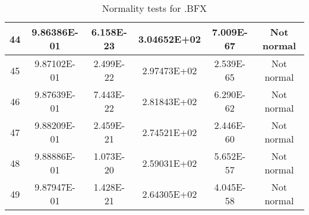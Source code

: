 \begin{table}[h]
\begin{tabular}{|c|c|c|c|c|c|}
		44 & 9.86386E-01 & 6.158E-23 & 3.04652E+02 & 7.009E-67 & Not normal\\\hline
		45 & 9.87102E-01 & 2.499E-22 & 2.97473E+02 & 2.539E-65 & Not normal\\\hline
		46 & 9.87639E-01 & 7.443E-22 & 2.81843E+02 & 6.290E-62 & Not normal\\\hline
		47 & 9.88209E-01 & 2.459E-21 & 2.74521E+02 & 2.446E-60 & Not normal\\\hline
		48 & 9.88886E-01 & 1.073E-20 & 2.59031E+02 & 5.652E-57 & Not normal\\\hline
		49 & 9.87947E-01 & 1.428E-21 & 2.64305E+02 & 4.045E-58 & Not normal\\\hline
	\end{tabular}
	\caption{Normality tests for .BFX}
	\label{tab:normality_tests_BFX}
\end{table}
